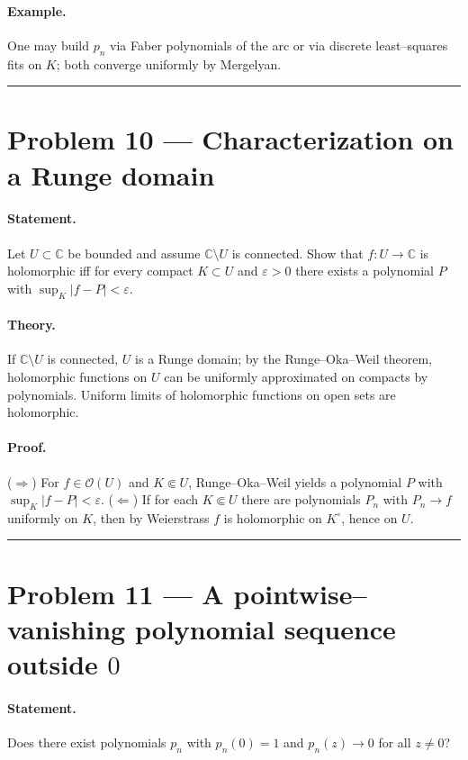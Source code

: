 \documentclass[12pt,a4paper]{article}
\theoremstyle{plain}
\theoremstyle{definition}
\theoremstyle{remark}
\theoremstyle{remark}
\begin{document}
\paragraph{Example.}
One may build $p_n$ via Faber polynomials of the arc or via discrete least–squares fits on $K$;
both converge uniformly by Mergelyan.


\noindent\rule{\textwidth}{0.4pt}

\bigskip
\section*{Problem 10 — Characterization on a Runge domain}

\paragraph{Statement.}
Let $U\subset\mathbb C$ be bounded and assume $\mathbb C\setminus U$ is connected.
Show that $f:U\to\mathbb C$ is holomorphic iff for every compact $K\subset U$ and $\varepsilon>0$
there exists a polynomial $P$ with $\sup_{K}|f-P|<\varepsilon$.

\paragraph{Theory.}
If $\mathbb C\setminus U$ is connected, $U$ is a Runge domain; by the
Runge–Oka–Weil theorem, holomorphic functions on $U$ can be uniformly approximated on compacts
by polynomials. Uniform limits of holomorphic functions on open sets are holomorphic.

\paragraph{Proof.}
($\Rightarrow$) For $f\in\mathcal O(U)$ and $K\Subset U$, Runge–Oka–Weil yields a polynomial $P$
with $\sup_{K}|f-P|<\varepsilon$.
($\Leftarrow$) If for each $K\Subset U$ there are polynomials $P_n$ with $P_n\to f$ uniformly on $K$,
then by Weierstrass $f$ is holomorphic on $K^\circ$, hence on $U$.

\noindent\rule{\textwidth}{0.4pt}


\bigskip
\section*{Problem 11 — A pointwise–vanishing polynomial sequence outside $0$}

\paragraph{Statement.}
Does there exist polynomials $p_n$ with $p_n(0)=1$ and $p_n(z)\to0$ for all $z\ne0$?
\end{document}
